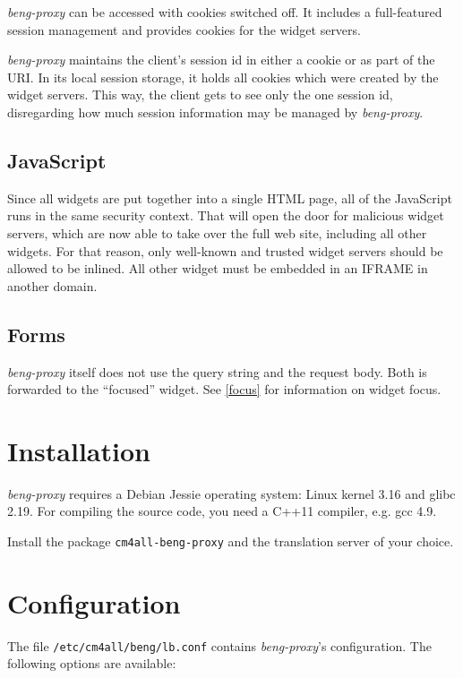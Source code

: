 \documentclass[a4paper,12pt]{article}
\begin{document}
\emph{beng-proxy} can be accessed with cookies switched off.  It includes a
full-featured session management and provides cookies for the widget
servers.

\emph{beng-proxy} maintains the client's session id in either a cookie
or as part of the URI.  In its local session storage, it holds all
cookies which were created by the widget servers.  This way, the
client gets to see only the one session id, disregarding how much
session information may be managed by \emph{beng-proxy}.


\subsection{JavaScript}

Since all widgets are put together into a single HTML page, all of the
JavaScript runs in the same security context.  That will open the door
for malicious widget servers, which are now able to take over the full
web site, including all other widgets.  For that reason, only
well-known and trusted widget servers should be allowed to be inlined.
All other widget must be embedded in an IFRAME in another domain.


\subsection{Forms}

\emph{beng-proxy} itself does not use the query string and the request
body.  Both is forwarded to the ``focused'' widget.  See \ref{focus}
for information on widget focus.


\section{Installation}

\emph{beng-proxy} requires a Debian Jessie operating system: Linux
kernel 3.16 and glibc 2.19.  For compiling the source code, you need
a C++11 compiler, e.g. gcc 4.9.

Install the package \texttt{cm4all-beng-proxy} and the translation
server of your choice.

\section{Configuration}

The file \texttt{/etc/cm4all/beng/lb.conf} contains
\emph{beng-proxy}'s configuration.  The following options are
available:
\end{document}
